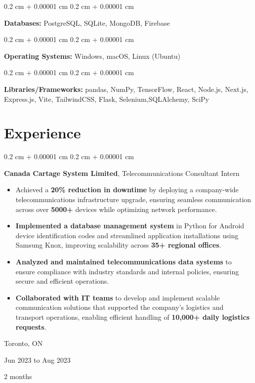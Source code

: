 \documentclass[10pt, letterpaper]{article}
\newenvironment{highlights}{
    \begin{itemize}[
        topsep=0.10 cm,
        parsep=0.10 cm,
        partopsep=0pt,
        itemsep=0pt,
        leftmargin=0.4 cm + 10pt
    ]
}{
    \end{itemize}
} %
\newenvironment{onecolentry}{
    \begin{adjustwidth}{
        0.2 cm + 0.00001 cm
    }{
        0.2 cm + 0.00001 cm
    }
}{
    \end{adjustwidth}
} %
\newenvironment{twocolentry}[2][]{
    \onecolentry
    \def\secondColumn{#2}
    \setcolumnwidth{\fill, 2.5 cm}
    \begin{paracol}{2}
}{
    \switchcolumn \raggedleft \secondColumn
    \end{paracol}
    \endonecolentry
} %
\begin{document}
        \vspace{0.05 cm}

        \begin{onecolentry}
            \textbf{Databases:} PostgreSQL, SQLite, MongoDB, Firebase
        \end{onecolentry}

        \vspace{0.05 cm}

        \begin{onecolentry}
            \textbf{Operating Systems:} Windows, macOS, Linux (Ubuntu)
        \end{onecolentry}

        \vspace{0.05 cm}

        \begin{onecolentry}
            \textbf{Libraries/Frameworks:} pandas, NumPy, TensorFlow, React, Node.js, Next.js, Express.js, Vite, TailwindCSS, Flask, Selenium,\newline SQLAlchemy, SciPy
        \end{onecolentry}


    
    \section{Experience}



        
        \begin{twocolentry}{
            Toronto, ON

        Jun 2023 to Aug 2023

        2 months
        }
            \textbf{Canada Cartage System Limited}, Telecommunications Consultant Intern
            \begin{highlights}
                \item Achieved a \textbf{20\% reduction in downtime} by deploying a company-wide telecommunications infrastructure upgrade, ensuring seamless communication across over \textbf{5000+} devices while optimizing network performance.
                \item \textbf{Implemented a database management system} in Python for Android device identification codes and streamlined application installations using Samsung Knox, improving scalability across \textbf{35+ regional offices}.
                \item \textbf{Analyzed and maintained telecommunications data systems} to ensure compliance with industry standards and internal policies, ensuring secure and efficient operations.
                \item \textbf{Collaborated with IT teams} to develop and implement scalable communication solutions that supported the company’s logistics and transport operations, enabling efficient handling of \textbf{10,000+ daily logistics requests}.
            \end{highlights}
        \end{twocolentry}
\end{document}
